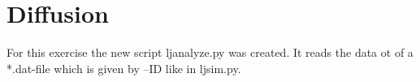 \section{Diffusion}

For this exercise the new script ljanalyze.py was created.
It reads the data ot of a *.dat-file which is given by --ID like in ljsim.py.
